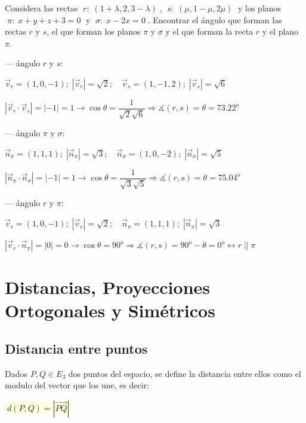 \begin{ejem}
Considera las rectas $\;r:\; (1+\lambda,2,3-\lambda)\;$, $\; s:\; (\mu,1-\mu, 2\mu)\;$ y los planos $\;\pi:\; x+y+z+3=0\;$ y $\;\sigma:\; x-2x=0\;$. Encontrar el ángulo que forman las rectas $r$ y $s$, el que forman los planos $\pi$ y $\sigma$ y el que forman la recta $r$ y el plano $\pi$.
	\end{ejem}

\noindent --- ángulo $r$ y $s$:

\noindent $\vec v_r=(1,0,-1);\; |\vec v_r|=\sqrt{2}; \quad \vec v_s=(1,-1,2);\; |\vec v_s|=\sqrt{6}$ 

\noindent $|\vec v_r \cdot \vec v_s|=|-1|=1 \to \cos \theta = \dfrac {1}{\sqrt{2}\sqrt{6}} \Rightarrow \measuredangle(r,s)=\theta=73.22^o$

\noindent --- ángulo $\pi$ y $\sigma$:

\noindent $\vec n_{\pi}=(1,1,1);\; |\vec n_{\pi}|=\sqrt{3}; \quad \vec n_{\sigma}=(1,0,-2);\; |\vec n_{\sigma}|=\sqrt{5}$ 

\noindent $|\vec n_{\pi} \cdot \vec n_{\sigma}|=|-1|=1 \to \cos \theta = \dfrac {1}{\sqrt{3}\sqrt{5}} \Rightarrow \measuredangle(r,s)=\theta=75.04^o$

\noindent --- ángulo $r$ y $\pi$:

\noindent $\vec v_r=(1,0,-1);\; |\vec v_r|=\sqrt{2}; \quad \vec n_{\pi}=(1,1,1);\; |\vec n_{\pi}|=\sqrt{3}$ 

\noindent $|\vec v_r \cdot \vec n_{\pi}|=|0|=0 \to \cos \theta = 90^o \Rightarrow \measuredangle(r,s)=90^o-\theta=0^o \leftrightarrow r\;||\; \pi$




\section[Distancias, Proyecciones Ortogonales y Simétricos]{Distancias, Proyecciones Ortogonales y Simétricos}

\subsection{Distancia entre puntos}


Dados $P,Q \in E_3$ dos puntos del espacio, se define la distancia entre ellos como el modulo del vector que los une, es decir: 

\centerline{ \colorbox{LightYellow}{$\; d(P,Q)=|\overrightarrow{PQ}|\;$}}

